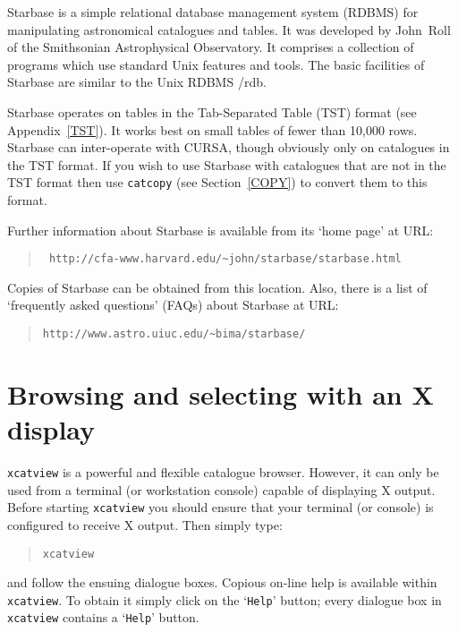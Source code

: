 \documentclass[twoside,11pt]{article}
\newcommand{\htmladdnormallink}[2]{#1}
\newcommand{\xlabel}[1]{}
\renewcommand{\_}{\texttt{\symbol{95}}}
\begin{document}
Starbase is a simple relational database management system (RDBMS)
for manipulating astronomical catalogues and tables.  It was developed
by John~Roll of the Smithsonian Astrophysical Observatory.  It comprises
a collection of programs which use standard Unix features and tools.  The
basic facilities of Starbase are similar to the Unix RDBMS /rdb.

Starbase operates on tables in the Tab-Separated Table (TST) format
(see Appendix~\ref{TST}).  It works best on small tables of fewer than
10,000 rows.  Starbase can inter-operate with CURSA, though obviously
only on catalogues in the TST format.  If you wish to use Starbase with
catalogues that are not in the TST format then use {\tt catcopy} (see
Section~\ref{COPY}) to convert them to this format.

Further information about Starbase is available from its `home page'
at URL:

\begin{quote}
\htmladdnormallink{{\tt
http://cfa-www.harvard.edu/\~{}john/starbase/starbase.html}}
{http://cfa-www.harvard.edu/\~{}john/starbase/starbase.html}
\end{quote}

Copies of Starbase can be obtained from this location.  Also, there is a
list of `frequently asked questions' (FAQs) about Starbase at URL:

\begin{quote}
\htmladdnormallink{{\tt http://www.astro.uiuc.edu/\~{}bima/starbase/}}
{http://www.astro.uiuc.edu/\~{}bima/starbase/}
\end{quote}


\section{\xlabel{XVIEW}\label{XVIEW}Browsing and selecting with an X display}

{\tt xcatview} is a powerful and flexible catalogue browser. However,
it can only be used from a terminal (or workstation console) capable
of displaying X output. Before starting {\tt xcatview} you should ensure
that your terminal (or console) is configured to receive X output. Then
simply type:

\begin{verse}
{\tt xcatview}
\end{verse}

and follow the ensuing dialogue boxes. Copious on-line help is available
within {\tt xcatview}. To obtain it simply click on the `{\tt Help}'
button; every dialogue box in {\tt xcatview} contains a `{\tt Help}'
button.
\end{document}
